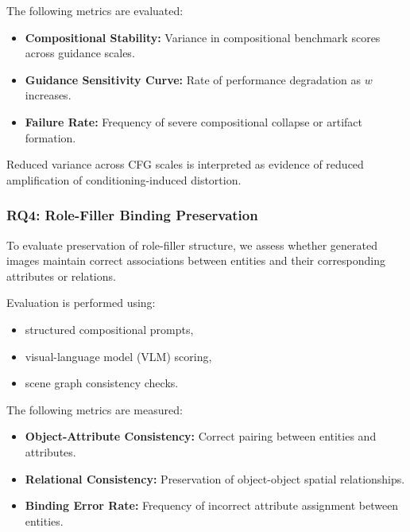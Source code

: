 \documentclass[a4paper,twoside,12pt]{report}
\begin{document}
The following metrics are evaluated:

\begin{itemize}
    \item \textbf{Compositional Stability:} Variance in compositional benchmark scores across guidance scales.

    \item \textbf{Guidance Sensitivity Curve:} Rate of performance degradation as \(w\) increases.

    \item \textbf{Failure Rate:} Frequency of severe compositional collapse or artifact formation.
\end{itemize}

Reduced variance across CFG scales is interpreted as evidence of reduced amplification of conditioning-induced distortion.

\subsubsection{RQ4: Role-Filler Binding Preservation}

To evaluate preservation of role-filler structure, we assess whether generated images maintain correct associations between entities and their corresponding attributes or relations.

Evaluation is performed using:

\begin{itemize}
    \item structured compositional prompts,
    \item visual-language model (VLM) scoring,
    \item scene graph consistency checks.
\end{itemize}

The following metrics are measured:

\begin{itemize}
    \item \textbf{Object-Attribute Consistency:} Correct pairing between entities and attributes.

    \item \textbf{Relational Consistency:} Preservation of object-object spatial relationships.

    \item \textbf{Binding Error Rate:} Frequency of incorrect attribute assignment between entities.
\end{itemize}
\end{document}
